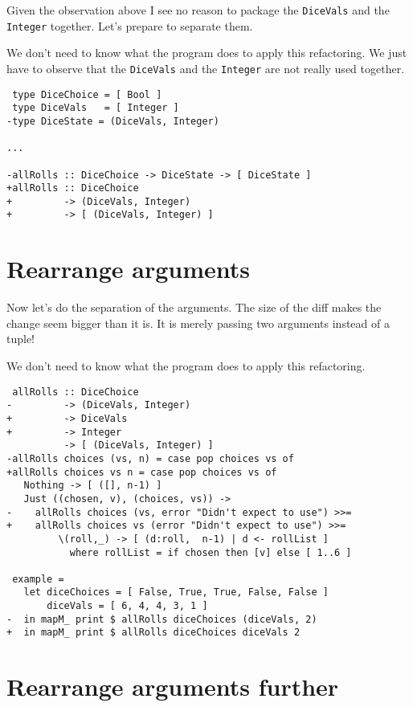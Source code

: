 Given the observation above I see no reason to package the \texttt{DiceVals} and the \texttt{Integer} together. Let's prepare to separate them.

We don't need to know what the program does to apply this refactoring. We just have to observe that the \texttt{DiceVals} and the \texttt{Integer} are not really used together.

\begin{verbatim}
 type DiceChoice = [ Bool ]
 type DiceVals   = [ Integer ]
-type DiceState = (DiceVals, Integer)

...

-allRolls :: DiceChoice -> DiceState -> [ DiceState ]
+allRolls :: DiceChoice
+         -> (DiceVals, Integer)
+         -> [ (DiceVals, Integer) ]
\end{verbatim}


\section{Rearrange arguments}


Now let's do the separation of the arguments. The size of the diff makes the change seem bigger than it is. It is merely passing two arguments instead of a tuple!

We don't need to know what the program does to apply this refactoring.

\begin{verbatim}
 allRolls :: DiceChoice
-         -> (DiceVals, Integer)
+         -> DiceVals
+         -> Integer
          -> [ (DiceVals, Integer) ]
-allRolls choices (vs, n) = case pop choices vs of
+allRolls choices vs n = case pop choices vs of
   Nothing -> [ ([], n-1) ]
   Just ((chosen, v), (choices, vs)) ->
-    allRolls choices (vs, error "Didn't expect to use") >>=
+    allRolls choices vs (error "Didn't expect to use") >>=
         \(roll,_) -> [ (d:roll,  n-1) | d <- rollList ]
           where rollList = if chosen then [v] else [ 1..6 ]

 example =
   let diceChoices = [ False, True, True, False, False ]
       diceVals = [ 6, 4, 4, 3, 1 ]
-  in mapM_ print $ allRolls diceChoices (diceVals, 2)
+  in mapM_ print $ allRolls diceChoices diceVals 2
\end{verbatim}

\section{Rearrange arguments further}

